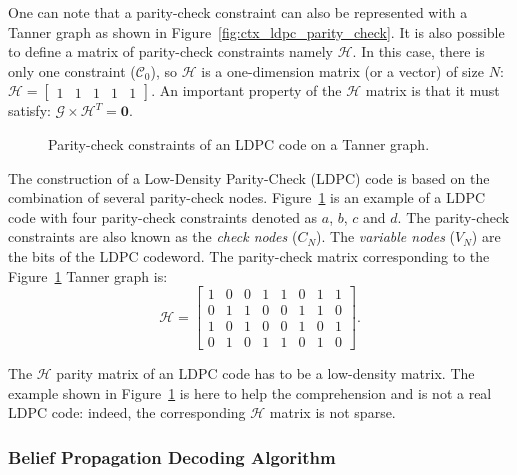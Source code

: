 One can note that a parity-check constraint can also be represented with a
Tanner graph as shown in Figure~\ref{fig:ctx_ldpc_parity_check}. It is also
possible to define a matrix of parity-check constraints namely
$\bm{\mathcal{H}}$. In this case, there is only one constraint
($\mathcal{C}_0$), so $\bm{\mathcal{H}}$ is a one-dimension matrix (or a vector)
of size $N$:
$
\bm{\mathcal{H}} =
\begin{bmatrix}
1 & 1 & 1 & 1 & 1
\end{bmatrix}.
$
An important property of the $\bm{\mathcal{H}}$ matrix is that it must satisfy:
$\bm{\mathcal{G}} \times \bm{\mathcal{H}}^T = \bm{0}.$

\begin{figure}[htp]
  \centering
  \caption{Parity-check constraints of an LDPC code on a Tanner graph.}
  \label{fig:ctx_ldpc_parity_checks}
\end{figure}

The construction of a Low-Density Parity-Check (LDPC) code is based on the
combination of several parity-check nodes.
Figure~\ref{fig:ctx_ldpc_parity_checks} is an example of a LDPC code with four
parity-check constraints denoted as $a$, $b$, $c$ and $d$. The parity-check
constraints are also known as the \emph{check nodes} ($C_N$). The \emph{variable
nodes} ($V_N$) are the bits of the LDPC codeword. The parity-check matrix
corresponding to the Figure~\ref{fig:ctx_ldpc_parity_checks} Tanner graph is:
\begin{equation*}
\bm{\mathcal{H}} =
\begin{bmatrix}
  1 & 0 & 0 & 1 & 1 & 0 & 1 & 1\\
  0 & 1 & 1 & 0 & 0 & 1 & 1 & 0\\
  1 & 0 & 1 & 0 & 0 & 1 & 0 & 1\\
  0 & 1 & 0 & 1 & 1 & 0 & 1 & 0
\end{bmatrix}.
\end{equation*}

The $\bm{\mathcal{H}}$ parity matrix of an LDPC code has to be a low-density
matrix. The example shown in
Figure~\ref{fig:ctx_ldpc_parity_checks} is here to help the comprehension and
is not a real LDPC code: indeed, the corresponding $\bm{\mathcal{H}}$ matrix is
not sparse.

\subsubsection{Belief Propagation Decoding Algorithm}

